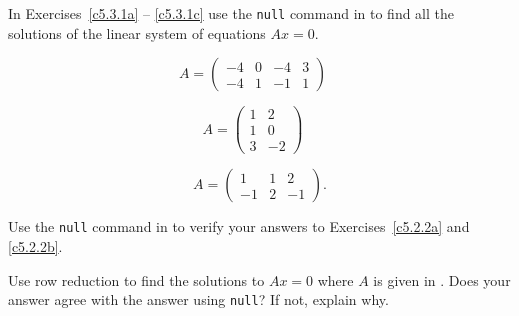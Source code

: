 \EXER

\CEXER

\noindent In Exercises~\ref{c5.3.1a} -- \ref{c5.3.1c} use the {\tt null}
command in \Matlab to find all the solutions of the linear system of
equations $Ax=0$.  
\begin{exercise} \label{c5.3.1a}
\begin{equation*} \label{e:BCDa}
          A=    \left(\begin{array}{cccc}
                -4 & 0 & -4 & 3\\
                -4 & 1 & -1 & 1
                \end{array}\right) \quad
\end{equation*}
\end{exercise}
\begin{exercise} \label{c5.3.1b}
\begin{equation*} \label{e:BCDb}
           A=    \left(\begin{array}{rr}
                1 & 2 \\
                1 & 0 \\
                3 & -2
                \end{array}\right) \quad
\end{equation*}
\end{exercise}
\begin{exercise} \label{c5.3.1c}
\begin{equation*} \label{e:BCDc}
          A=      \left(\begin{array}{rrr}
               1  &  1  &  2\\
              -1  &  2  & -1
                \end{array}\right).
\end{equation*}
\end{exercise}

\begin{exercise} \label{c5.3.2}
Use the {\tt null} command in \Matlab to verify your answers to
Exercises~\ref{c5.2.2a} and \ref{c5.2.2b}.
\end{exercise}

\begin{exercise} \label{c5.3.3}
Use row reduction to find the solutions to $Ax=0$ where $A$ is
given in .  Does your answer agree with the \Matlab
answer using {\tt null}?  If not, explain why.
\end{exercise}

